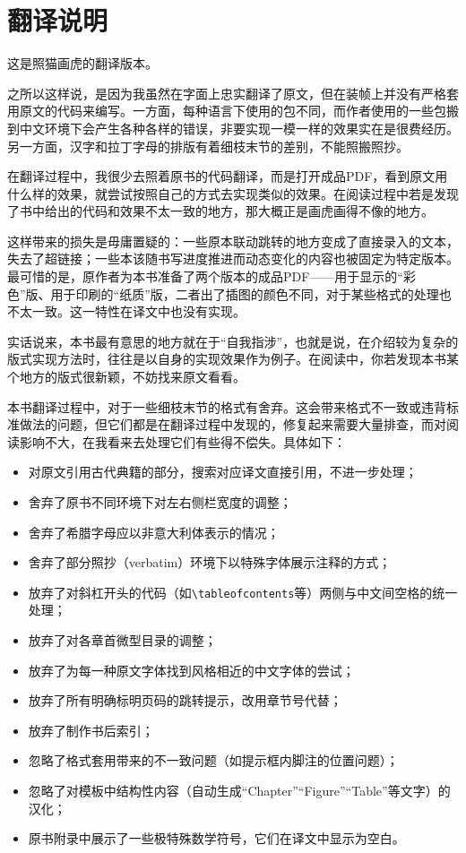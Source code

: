 \chapter*{翻译说明}

这是照猫画虎的翻译版本。

之所以这样说，是因为我虽然在字面上忠实翻译了原文，但在装帧上并没有严格套用原文的代码来编写。一方面，每种语言下使用的包不同，而作者使用的一些包搬到中文环境下会产生各种各样的错误，非要实现一模一样的效果实在是很费经历。另一方面，汉字和拉丁字母的排版有着细枝末节的差别，不能照搬照抄。

在翻译过程中，我很少去照着原书的代码翻译，而是打开成品PDF，看到原文用什么样的效果，就尝试按照自己的方式去实现类似的效果。在阅读过程中若是发现了书中给出的代码和效果不太一致的地方，那大概正是画虎画得不像的地方。

这样带来的损失是毋庸置疑的：一些原本联动跳转的地方变成了直接录入的文本，失去了超链接；一些本该随书写进度推进而动态变化的内容也被固定为特定版本。最可惜的是，原作者为本书准备了两个版本的成品PDF——用于显示的“彩色”版、用于印刷的“纸质”版，二者出了插图的颜色不同，对于某些格式的处理也不太一致。这一特性在译文中也没有实现。

实话说来，本书最有意思的地方就在于“自我指涉”，也就是说，在介绍较为复杂的版式实现方法时，往往是以自身的实现效果作为例子。在阅读中，你若发现本书某个地方的版式很新颖，不妨找来原文看看。

本书翻译过程中，对于一些细枝末节的格式有舍弃。这会带来格式不一致或违背标准做法的问题，但它们都是在翻译过程中发现的，修复起来需要大量排查，而对阅读影响不大，在我看来去处理它们有些得不偿失。具体如下：
\begin{itemize}
    \item 对原文引用古代典籍的部分，搜索对应译文直接引用，不进一步处理；
    \item 舍弃了原书不同环境下对左右侧栏宽度的调整；
    \item 舍弃了希腊字母应以非意大利体表示的情况；
    \item 舍弃了部分照抄（verbatim）环境下以特殊字体展示注释的方式；
    \item 放弃了对斜杠开头的代码（如\verb+\tableofcontents+等）两侧与中文间空格的统一处理；
    \item 放弃了对各章首微型目录的调整；
    \item 放弃了为每一种原文字体找到风格相近的中文字体的尝试；
    \item 放弃了所有明确标明页码的跳转提示，改用章节号代替；
    \item 放弃了制作书后索引；
    \item 忽略了格式套用带来的不一致问题（如提示框内脚注的位置问题）；
    \item 忽略了对模板中结构性内容（自动生成“Chapter”“Figure”“Table”等文字）的汉化；
    \item 原书附录中展示了一些极特殊数学符号，它们在译文中显示为空白。
\end{itemize}

